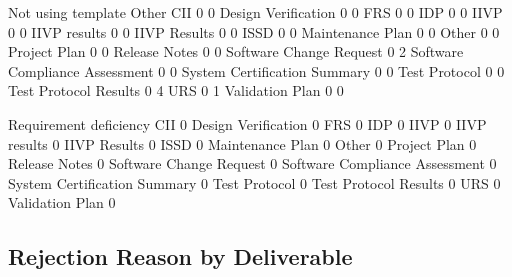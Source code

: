 \documentclass{article}
\begin{document}
\begin{Schunk}
\begin{Soutput}
                                 Not using template Other
  CII                                             0     0
  Design Verification                             0     0
  FRS                                             0     0
  IDP                                             0     0
  IIVP                                            0     0
  IIVP results                                    0     0
  IIVP Results                                    0     0
  ISSD                                            0     0
  Maintenance Plan                                0     0
  Other                                           0     0
  Project Plan                                    0     0
  Release Notes                                   0     0
  Software Change Request                         0     2
  Software Compliance Assessment                  0     0
  System Certification Summary                    0     0
  Test Protocol                                   0     0
  Test Protocol Results                           0     4
  URS                                             0     1
  Validation Plan                                 0     0
                                
                                 Requirement deficiency
  CII                                                 0
  Design Verification                                 0
  FRS                                                 0
  IDP                                                 0
  IIVP                                                0
  IIVP results                                        0
  IIVP Results                                        0
  ISSD                                                0
  Maintenance Plan                                    0
  Other                                               0
  Project Plan                                        0
  Release Notes                                       0
  Software Change Request                             0
  Software Compliance Assessment                      0
  System Certification Summary                        0
  Test Protocol                                       0
  Test Protocol Results                               0
  URS                                                 0
  Validation Plan                                     0
\end{Soutput}
\end{Schunk}


\subsection{Rejection Reason by Deliverable}
\end{document}
